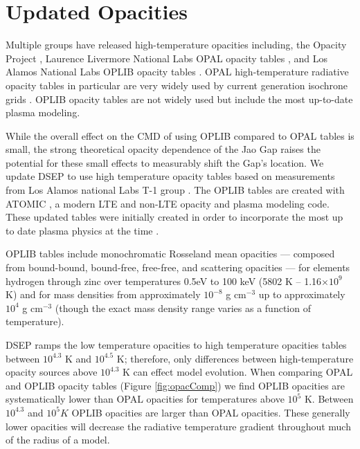 \section{Updated Opacities}\label{sec:opac}
Multiple groups have released high-temperature opacities including, the Opacity
Project \citep[OP][]{Seaton1994}, Laurence Livermore National Labs OPAL opacity
tables \citep{Iglesias1996}, and Los Alamos National Labs OPLIB opacity tables
\citep{Colgan2016}. OPAL high-temperature radiative opacity tables in
particular are very widely used by current generation isochrone grids
\citep[e.g. Dartmouth, MIST, \& StarEvol, ][]{Dotter2008,Choi2016,Amard2019}.
OPLIB opacity tables \citep{Colgan2016} are not widely used but include the
most up-to-date plasma modeling.

While the overall effect on the CMD of using OPLIB compared to OPAL tables is
small, the strong theoretical opacity dependence of the Jao Gap raises the
potential for these small effects to measurably shift the Gap's location. We
update DSEP to use high temperature opacity tables based on measurements from
Los Alamos national Labs T-1 group \citep[OPLIB,][]{Colgan2016}. The OPLIB
tables are created with ATOMIC \citep{Magee2004,Hakel2006,Fontes2016}, a modern
LTE and non-LTE opacity and plasma modeling code. These updated tables were
initially created in order to incorporate the most up to date plasma
physics at the time \citep{Bahcall2005}. 

OPLIB tables include monochromatic Rosseland mean opacities --- composed from
bound-bound, bound-free, free-free, and scattering opacities --- for elements
hydrogen through zinc over temperatures 0.5eV to 100 keV (5802 K -- 1.16$\times
10 ^{9}$ K) and for mass densities from approximately $10^{-8}$ g cm$^{-3}$ up
to approximately $10^{4}$ g cm$^{-3}$ (though the exact mass density range
varies as a function of temperature). 

DSEP ramps the \citet{Ferguson2005} low temperature opacities to high
temperature opacities tables between $10^{4.3}$ K and $10^{4.5}$ K; therefore,
only differences between high-temperature opacity sources above $10^{4.3}$ K
can effect model evolution. When comparing OPAL and OPLIB opacity tables
(Figure \ref{fig:opacComp}) we find OPLIB opacities are systematically lower
than OPAL opacities for temperatures above $10^{5}$ K. Between $10^{4.3}$ and
$10^{5} K$ OPLIB opacities are larger than OPAL opacities. These generally
lower opacities will decrease the radiative temperature gradient throughout
much of the radius of a model.

